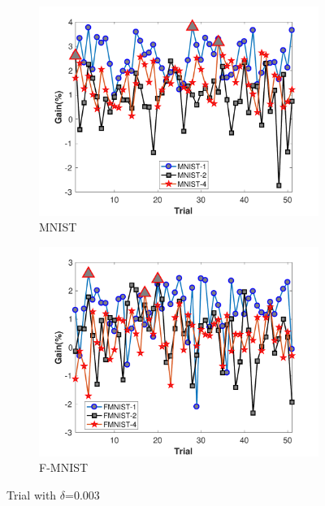 \begin{figure}
	\begin{subfigure}[b]{.46\linewidth}{}
		\includegraphics[keepaspectratio = True, scale = 0.31]{figures/MNIST_3}
		\centering
		\caption{MNIST}
	\end{subfigure}
	\begin{subfigure}[b]{.46\linewidth}
		\includegraphics[keepaspectratio = True, scale = 0.31]{figures/FMNIST_3}
		\caption{F-MNIST}
	\end{subfigure}
	\caption{Trial with $\delta$=0.003}
	\label{fig:trial2}
\end{figure}
